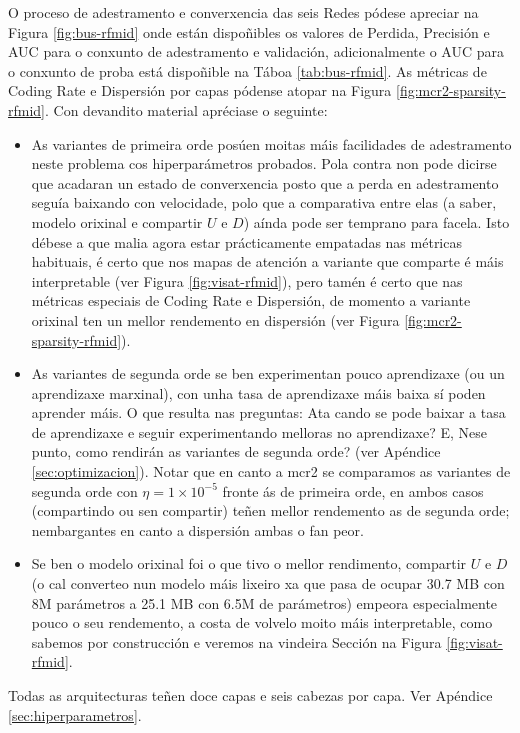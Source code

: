 O proceso de adestramento e converxencia das seis Redes pódese apreciar na Figura \ref{fig:bus-rfmid} onde están dispoñibles os valores de Perdida, Precisión e AUC para o conxunto de adestramento e validación, adicionalmente o AUC para o conxunto de proba está dispoñible na Táboa \ref{tab:bus-rfmid}. As métricas de Coding Rate e Dispersión por capas pódense atopar na Figura \ref{fig:mcr2-sparsity-rfmid}. Con devandito material apréciase o seguinte:
\begin{itemize}
				\item As variantes de primeira orde posúen moitas máis facilidades de adestramento neste problema cos hiperparámetros probados. Pola contra non pode dicirse que acadaran un estado de converxencia posto que a perda en adestramento seguía baixando con velocidade, polo que a comparativa entre elas (a saber, modelo orixinal e compartir $U$ e $D$) aínda pode ser temprano para facela. Isto débese a que malia agora estar prácticamente empatadas nas métricas habituais, é certo que nos mapas de atención a variante que comparte é máis interpretable (ver Figura \ref{fig:visat-rfmid}), pero tamén é certo que nas métricas especiais de Coding Rate e Dispersión, de momento a variante orixinal ten un mellor rendemento en dispersión (ver Figura \ref{fig:mcr2-sparsity-rfmid}).
				\item As variantes de segunda orde se ben experimentan pouco aprendizaxe (ou un aprendizaxe marxinal), con unha \gls{tasa de aprendizaxe} máis baixa sí poden aprender máis. O que resulta nas preguntas: Ata cando se pode baixar a \gls{tasa de aprendizaxe} e seguir experimentando melloras no aprendizaxe? E, Nese punto, como rendirán as variantes de segunda orde? (ver Apéndice \ref{sec:optimizacion}). Notar que en canto a \acrshort{mcr2} se comparamos as variantes de segunda orde con $\eta= 1\times 10^{-5}$ fronte ás de primeira orde, en ambos casos (compartindo ou sen compartir) teñen mellor rendemento as de segunda orde; nembargantes en canto a dispersión ambas o fan peor.
				\item Se ben o modelo orixinal foi o que tivo o mellor rendimento, compartir $U$ e $D$ (o cal converteo nun modelo máis lixeiro xa que pasa de ocupar 30.7 MB con 8M parámetros a 25.1 MB con 6.5M de parámetros) empeora especialmente pouco o seu rendemento, a costa de volvelo moito máis interpretable, como sabemos por construcción e veremos na vindeira Sección na Figura \ref{fig:visat-rfmid}.

\end{itemize}
Todas as arquitecturas teñen doce capas e seis cabezas por capa. Ver Apéndice \ref{sec:hiperparametros}.
